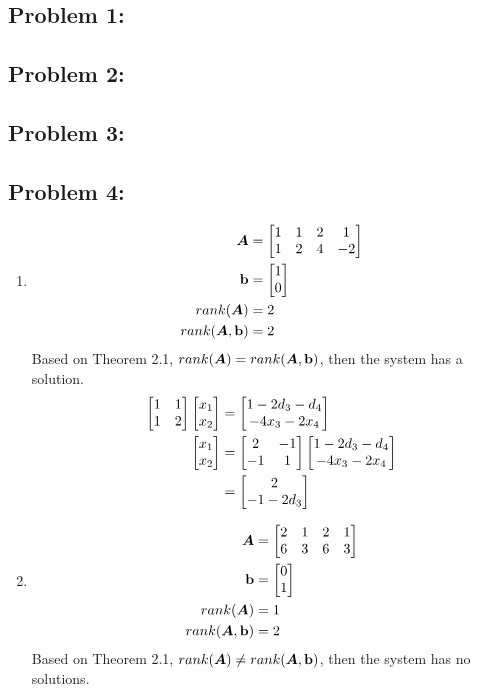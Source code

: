 \documentclass{article}
\begin{document}
 

\hypertarget{}{}
\subsection*{{Problem 1: }}
\label{}


\hypertarget{}{}
\subsection*{{Problem 2: }}
\label{}


\hypertarget{}{}
\subsection*{{Problem 3: }}
\label{}

\hypertarget{}{}
\subsection*{{Problem 4: }}
\label{}
\begin{enumerate} 
\item 
\begin{align*} 
\boldsymbol{A} &= \begin{bmatrix} 1 & 1 & 2 & 1 \\ 1 & 2 & 4 & -2  \end{bmatrix}  \\ 
\boldsymbol{\mathrm{b}} &= \begin{bmatrix} 1 \\ 0  \end{bmatrix}  \\
rank(\boldsymbol{A}) &= 2 \\
rank(\boldsymbol{A}, \boldsymbol{\mathrm{b}}) &= 2 \\
\end{align*} 
Based on Theorem 2.1, $rank(\boldsymbol{A}) = rank(\boldsymbol{A},\boldsymbol{\mathrm{b}}) $, then the system has a solution. 
\begin{align*}
\begin{bmatrix} 1 & 1\\ 1 & 2 \end{bmatrix} \begin{bmatrix} x_1 \\ x_2 \end{bmatrix} &= \begin{bmatrix} 1-2d_3-d_4 \\ -4x_3-2x_4 \end{bmatrix}  \\
\begin{bmatrix} x_1\\ x_2 \end{bmatrix} &= \begin{bmatrix} 2 & -1 \\ -1 & 1 \end{bmatrix} \begin{bmatrix} 1-2d_3-d_4 \\ -4x_3-2x_4 \end{bmatrix} \\
& = \begin{bmatrix} 2 \\ -1-2d_3 \end{bmatrix}
\end{align*}


\item 
\begin{align*}
\boldsymbol{A}& =\begin{bmatrix} 2 & 1 & 2 & 1\\ 6 & 3 & 6 & 3 \end{bmatrix} \\
\boldsymbol{\mathrm{b}} &= \begin{bmatrix} 0 \\ 1  \end{bmatrix} \\
rank(\boldsymbol{A}) &= 1\\
rank(\boldsymbol{A}, \boldsymbol{\mathrm{b}})& = 2
\end{align*} 
Based on Theorem 2.1, $rank(\boldsymbol{A}) \neq rank(\boldsymbol{A}, \boldsymbol{\mathrm{b}})$, then the system has no solutions. 
\end{enumerate}
\end{document}
